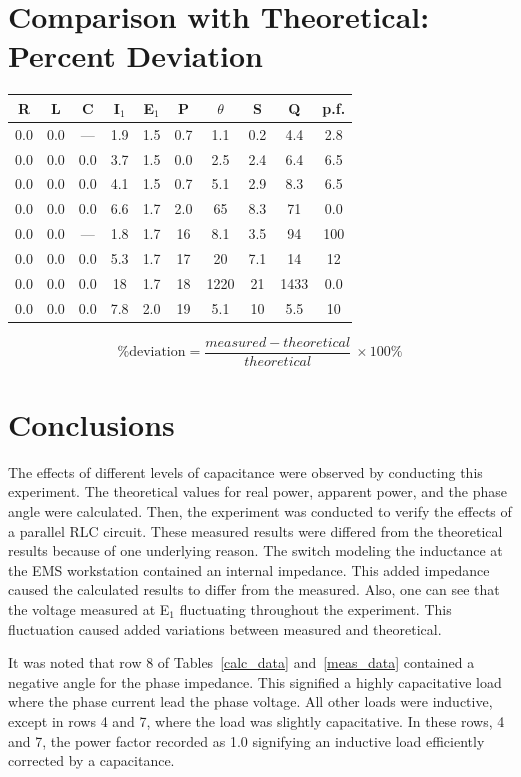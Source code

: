 \documentclass{article}
\begin{document}
\section{Comparison with Theoretical: Percent Deviation}
\begin{table}[h]
  \begin{center}
    \begin{tabular}{cccccccccc}
      \hline
      R & L & C & I$_1$ & E$_1$ & P & $\theta$ & S & Q & p.f. \\
      \hline
      0.0 & 0.0 & --- & 1.9 & 1.5 & 0.7 & 1.1  & 0.2 & 4.4  & 2.8 \\
      0.0 & 0.0 & 0.0 & 3.7 & 1.5 & 0.0 & 2.5  & 2.4 & 6.4  & 6.5 \\
      0.0 & 0.0 & 0.0 & 4.1 & 1.5 & 0.7 & 5.1  & 2.9 & 8.3  & 6.5 \\
      0.0 & 0.0 & 0.0 & 6.6 & 1.7 & 2.0 & 65   & 8.3 & 71   & 0.0 \\
      0.0 & 0.0 & --- & 1.8 & 1.7 & 16  & 8.1  & 3.5 & 94   & 100 \\
      0.0 & 0.0 & 0.0 & 5.3 & 1.7 & 17  & 20   & 7.1 & 14   & 12  \\
      0.0 & 0.0 & 0.0 & 18  & 1.7 & 18  & 1220 & 21  & 1433 & 0.0 \\
      0.0 & 0.0 & 0.0 & 7.8 & 2.0 & 19  & 5.1  & 10  & 5.5  & 10  \\
    \end{tabular}
  \end{center}
\end{table}

\[\text{\%deviation} = \frac{measured - theoretical}{theoretical}\ \times \text{100\%}\]

\section{Conclusions}
The effects of different levels of capacitance were observed by conducting this
experiment. The theoretical values for real power, apparent power, and the
phase angle were calculated. Then, the experiment was conducted to verify the
effects of a parallel RLC circuit. These measured results were differed from
the theoretical results because of one underlying reason. The switch modeling
the inductance at the EMS workstation contained an internal impedance.  This
added impedance caused the calculated results to differ from the measured.
Also, one can see that the voltage measured at E$_1$ fluctuating throughout the
experiment. This fluctuation caused added variations between measured and
theoretical.

It was noted that row 8 of Tables~\ref{calc_data} and~\ref{meas_data} contained
a negative angle for the phase impedance. This signified a highly capacitative
load where the phase current lead the phase voltage. All other loads were
inductive, except in rows 4 and 7, where the load was slightly capacitative. In
these rows, 4 and 7, the power factor recorded as 1.0 signifying an inductive
load efficiently corrected by a capacitance.
\end{document}
